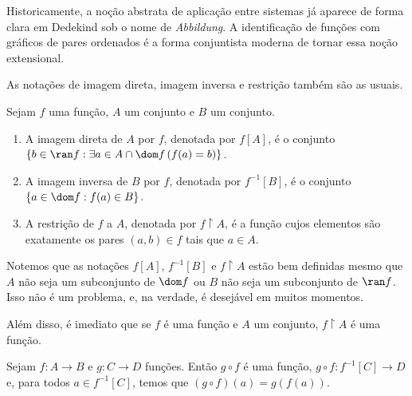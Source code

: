 Historicamente, a noção abstrata de aplicação entre sistemas já aparece de
forma clara em Dedekind \cite[\S 21]{dedekind1888was} sob o nome de \emph{Abbildung}.
A identificação de funções com gráficos de pares
ordenados é a forma conjuntista moderna de tornar essa noção extensional.

As notações de imagem direta, imagem inversa e restrição também são as usuais.

\begin{definition}[$\BST$]\label{def:imagemDiretaImagemInversaRestricao}
    Sejam $f$ uma função, $A$ um conjunto e $B$ um conjunto.
    \begin{enumerate}[label=(\alph*)]
        \item A imagem direta de $A$ por $f$, denotada por $f[A]$, é o conjunto $\{b \in \ran f : \exists a \in A\cap \dom f\, (f(a) = b)\}$.
        \item A imagem inversa de $B$ por $f$, denotada por $f^{-1}[B]$, é o conjunto $\{a \in \dom f : f(a) \in B\}$.
        \item A restrição de $f$ a $A$, denotada por $f\restriction A$, é a função cujos elementos são exatamente os pares $(a,b)\in f$ tais que $a\in A$.
    \end{enumerate}
\end{definition}

Notemos que as notações $f[A]$, $f^{-1}[B]$ e $f\restriction A$ estão bem definidas mesmo que $A$ não seja um subconjunto de $\dom f$ ou $B$ não seja um subconjunto de $\ran f$.
Isso não é um problema, e, na verdade, é desejável em muitos momentos.

Além disso, é imediato que se $f$ é uma função e $A$ um conjunto, $f\restriction A$ é uma função.
\begin{lemma}[$\BST$]\label{lem:composicaoDeFuncoes}
    Sejam $f:A\to B$ e $g:C\to D$ funções.
    Então $g\circ f$ é uma função, $g\circ f:f^{-1}[C] \to D$ e, para todos $a \in f^{-1}[C]$, temos que $(g\circ f)(a) = g(f(a))$.
\end{lemma}

